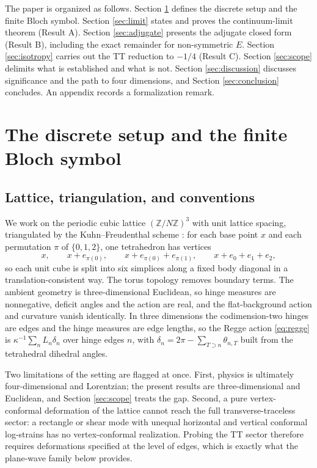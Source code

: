 \documentclass[11pt]{article}
\theoremstyle{definition}
\theoremstyle{remark}
\newcommand{\Z}{\mathbb{Z}}
\begin{document}
The paper is organized as follows. Section \ref{sec:setup} defines the discrete setup and the finite Bloch symbol. Section \ref{sec:limit} states and proves the continuum-limit theorem (Result A). Section \ref{sec:adjugate} presents the adjugate closed form (Result B), including the exact remainder for non-symmetric $E$. Section \ref{sec:isotropy} carries out the TT reduction to $-1/4$ (Result C). Section \ref{sec:scope} delimits what is established and what is not. Section \ref{sec:discussion} discusses significance and the path to four dimensions, and Section \ref{sec:conclusion} concludes. An appendix records a formalization remark.

\section{The discrete setup and the finite Bloch symbol}
\label{sec:setup}

\subsection{Lattice, triangulation, and conventions}

We work on the periodic cubic lattice $(\Z/N\Z)^3$ with unit lattice spacing, triangulated by the Kuhn--Freudenthal scheme \cite{Freudenthal, Kuhn}: for each base point $x$ and each permutation $\pi$ of $\{0,1,2\}$, one tetrahedron has vertices
\[
x,\qquad x+e_{\pi(0)},\qquad x+e_{\pi(0)}+e_{\pi(1)},\qquad x+e_0+e_1+e_2,
\]
so each unit cube is split into six simplices along a fixed body diagonal in a translation-consistent way. The torus topology removes boundary terms. The ambient geometry is three-dimensional Euclidean, so hinge measures are nonnegative, deficit angles and the action are real, and the flat-background action and curvature vanish identically. In three dimensions the codimension-two hinges are edges and the hinge measures are edge lengths, so the Regge action \eqref{eq:regge} is $\kappa^{-1}\sum_n L_n \delta_n$ over hinge edges $n$, with $\delta_n = 2\pi - \sum_{T\supset n}\theta_{n,T}$ built from the tetrahedral dihedral angles.

Two limitations of the setting are flagged at once. First, physics is ultimately four-dimensional and Lorentzian; the present results are three-dimensional and Euclidean, and Section \ref{sec:scope} treats the gap. Second, a pure vertex-conformal deformation of the lattice cannot reach the full transverse-traceless sector: a rectangle or shear mode with unequal horizontal and vertical conformal log-strains has no vertex-conformal realization. Probing the TT sector therefore requires deformations specified at the level of edges, which is exactly what the plane-wave family below provides.
\end{document}
